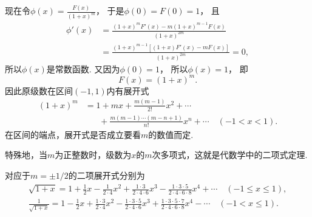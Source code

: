 \begin{example}
\begin{solution}
现在令\(\phi(x) = \frac{F(x)}{(1+x)^m}\)，
于是\(\phi(0) = F(0) = 1\)，
且\begin{align*}
	\phi'(x)
	&= \frac{(1+x)^m F'(x) - m(1+x)^{m-1} F(x)}{(1+x)^{2m}} \\
	&= \frac{(1+x)^{m-1} [(1+x) F'(x) - m F(x)]}{(1+x)^{2m}}
	= 0,
\end{align*}
所以\(\phi(x)\)是常数函数.
又因为\(\phi(0) = 1\)，
所以\(\phi(x) = 1\)，
即\begin{equation*}
	F(x) = (1+x)^m.
\end{equation*}
因此原级数在区间\((-1,1)\)内有展开式
\begin{equation}\label{equation:无穷级数.二项展开式}
\begin{split}
	(1+x)^m
	&= 1+mx+\frac{m(m-1)}{2!}x^2+\dotsb \\
	&\hspace{20pt} +\frac{m(m-1)\dotsm(m-n+1)}{n!}x^n+\dotsb
	\quad(-1<x<1).
\end{split}
\end{equation}
在区间的端点，展开式是否成立要看\(m\)的数值而定.
\end{solution}
\end{example}

特殊地，当\(m\)为正整数时，级数为\(x\)的\(m\)次多项式，这就是代数学中的二项式定理.

对应于\(m=\pm1/2\)的二项展开式分别为\begin{gather*}
	\sqrt{1+x}
	= 1+\frac{1}{2}x-\frac{1}{2\cdot4}x^2+\frac{1\cdot3}{2\cdot4\cdot6}x^3-\frac{1\cdot3\cdot5}{2\cdot4\cdot6\cdot8}x^4+\dotsb
	\quad(-1 \leq x \leq 1), \\
	\frac{1}{\sqrt{1+x}}
	= 1-\frac{1}{2}x+\frac{1\cdot3}{2\cdot4}x^2-\frac{1\cdot3\cdot5}{2\cdot4\cdot6}x^3+\frac{1\cdot3\cdot5\cdot7}{2\cdot4\cdot6\cdot8}x^4-\dotsb
	\quad(-1 < x \leq 1).
\end{gather*}

